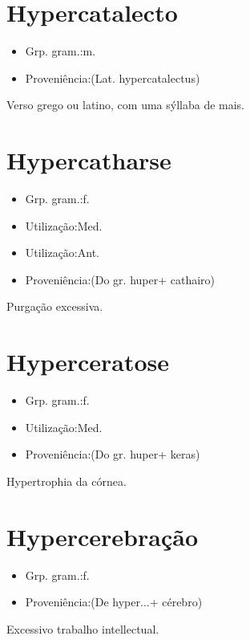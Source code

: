 \documentclass{article}
\begin{document}
\section{Hypercatalecto}
\begin{itemize}
\item {Grp. gram.:m.}
\end{itemize}
\begin{itemize}
\item {Proveniência:(Lat. \textunderscore hypercatalectus\textunderscore )}
\end{itemize}
Verso grego ou latino, com uma sýllaba de mais.
\section{Hypercatharse}
\begin{itemize}
\item {Grp. gram.:f.}
\end{itemize}
\begin{itemize}
\item {Utilização:Med.}
\end{itemize}
\begin{itemize}
\item {Utilização:Ant.}
\end{itemize}
\begin{itemize}
\item {Proveniência:(Do gr. \textunderscore huper\textunderscore  + \textunderscore cathairo\textunderscore )}
\end{itemize}
Purgação excessiva.
\section{Hyperceratose}
\begin{itemize}
\item {Grp. gram.:f.}
\end{itemize}
\begin{itemize}
\item {Utilização:Med.}
\end{itemize}
\begin{itemize}
\item {Proveniência:(Do gr. \textunderscore huper\textunderscore  + \textunderscore keras\textunderscore )}
\end{itemize}
Hypertrophia da córnea.
\section{Hypercerebração}
\begin{itemize}
\item {Grp. gram.:f.}
\end{itemize}
\begin{itemize}
\item {Proveniência:(De \textunderscore hyper...\textunderscore  + \textunderscore cérebro\textunderscore )}
\end{itemize}
Excessivo trabalho intellectual.
\end{document}
